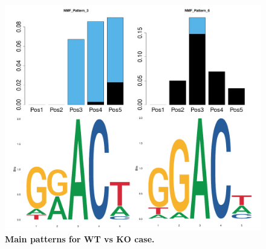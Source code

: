 \documentclass[times, 11pt, a4paper]{article}
\begin{document}
\begin{figure}[h!]
	\includegraphics[width = 1\textwidth]{img/pattern_WT_KO.pdf}
	\caption{\textbf{Main patterns for WT  vs KO case.} }
	\label{fig:pattern_WT.KO}
\end{figure}
\end{document}
